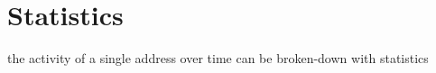 \section{Statistics} \label{sec:hybrid-stats}

the activity of a single address over time can be broken-down with statistics